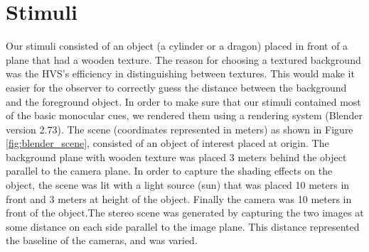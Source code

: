 \section{Stimuli}
Our stimuli consisted of an object (a cylinder or a dragon) placed in front of a plane that had a wooden texture. The reason for choosing a textured background was the HVS's efficiency in distinguishing between textures. This would make it easier for the observer to correctly guess the distance between the background and the foreground object. In order to make sure that our stimuli contained most of the basic monocular cues, we rendered them using a rendering system (Blender  version 2.73).
The scene (coordinates represented in meters) as shown in Figure \ref{fig:blender_scene}, consisted of an object of interest placed at origin. The background plane with wooden texture was placed 3 meters behind the object parallel to the camera plane. In order to capture the shading effects on the object, the scene was lit with a light source (sun) that was placed 10 meters in front and 3 meters at height of the object. Finally the camera was 10 meters in front of the object.The stereo scene was generated by capturing the two images at some distance on each side parallel to the image plane. This distance represented the baseline of the cameras, and was varied.

